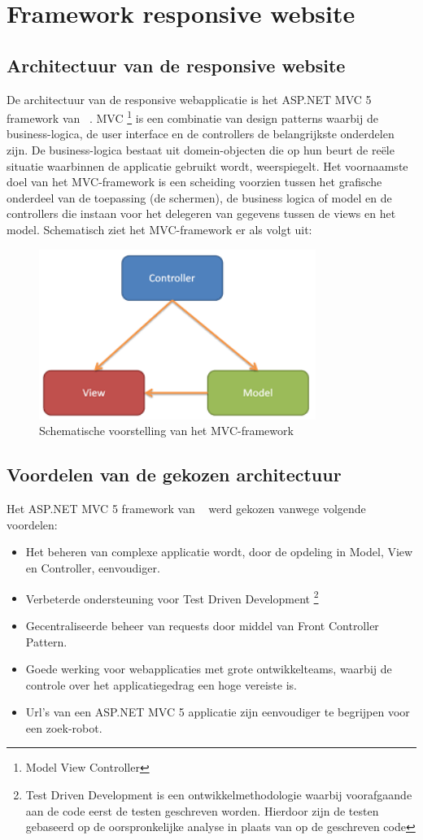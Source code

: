 \chapter{Framework responsive website}
\label{ch:frameworkresponsivewebsite}
\section{Architectuur van de responsive website}
De architectuur van de responsive webapplicatie is het ASP.NET MVC 5 framework van ~\cite{aspnetmvcoverview2017}.
MVC \footnote{Model View Controller} is een combinatie van design patterns waarbij de business-logica, de user interface en de controllers de belangrijkste
onderdelen zijn. De business-logica bestaat uit domein-objecten die op hun beurt de reële situatie waarbinnen de applicatie
gebruikt wordt, weerspiegelt. Het voornaamste doel van het MVC-framework is een scheiding voorzien tussen het grafische
onderdeel van de toepassing (de schermen), de business logica of model en de controllers die instaan voor het delegeren van gegevens
tussen de views en het model. Schematisch ziet het MVC-framework er als volgt uit:
\begin{figure}[ht!]
\centering
\caption{Schematische voorstelling van het MVC-framework \cite{aspnetmvcoverview2017}}
\includegraphics[width=90mm]{./img/mvc.png}
\end{figure}
\section{Voordelen van de gekozen architectuur}
Het ASP.NET MVC 5 framework van ~\cite{aspnetmvcoverview2017} werd gekozen vanwege volgende voordelen:
\begin{itemize}
  \item Het beheren van complexe applicatie wordt, door de opdeling in Model, View en Controller, eenvoudiger.
  \item Verbeterde ondersteuning voor Test Driven Development \footnote{Test Driven Development is een ontwikkelmethodologie waarbij voorafgaande aan de code eerst de testen geschreven worden. Hierdoor zijn de testen gebaseerd op de oorspronkelijke analyse in plaats van op de geschreven code}
  \item Gecentraliseerde beheer van requests door middel van Front Controller Pattern.
  \item Goede werking voor webapplicaties met grote ontwikkelteams, waarbij de controle over het applicatiegedrag een hoge vereiste is.
  \item Url's van een ASP.NET MVC 5 applicatie zijn eenvoudiger te begrijpen voor een zoek-robot.
\end{itemize}

